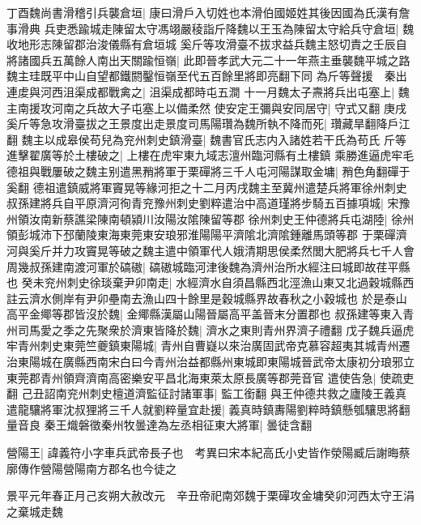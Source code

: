 丁酉魏尚書滑稽引兵襲倉垣|{
	康曰滑戶入切姓也本滑伯國姬姓其後因國為氏漢有詹事滑典}
兵吏悉踰城走陳留太守馮翊嚴稜詣斤降魏以王玉為陳留太守給兵守倉垣|{
	魏收地形志陳留郡治浚儀縣有倉垣城}
奚斤等攻滑臺不拔求益兵魏主怒切責之壬辰自將諸國兵五萬餘人南出天關踰恒嶺|{
	此即晉孝武大元二十一年燕主垂襲魏平城之路魏主珪既平中山自望都鐵閼鑿恒嶺至代五百餘里將即亮翻下同}
為斤等聲援　秦出連䖍與河西沮渠成都戰禽之|{
	沮渠成都時屯五澗}
十一月魏太子燾將兵出屯塞上|{
	魏主南援攻河南之兵故大子屯塞上以備柔然}
使安定王彌與安同居守|{
	守式又翻}
庚戌奚斤等急攻滑臺拔之王景度出走景度司馬陽瓚為魏所執不降而死|{
	瓚藏旱翻降戶江翻}
魏主以成皋侯苟兒為兖州刺史鎮滑臺|{
	魏書官氏志内入諸姓若干氏為苟氏}
斤等進擊翟廣等於土樓破之|{
	上樓在虎牢東九域志澶州臨河縣有土樓鎮}
乘勝進逼虎牢毛德祖與戰屢破之魏主别遣黑矟將軍于栗磾將三千人屯河陽謀取金墉|{
	矟色角翻磾于奚翻}
德祖遣鎮威將軍竇晃等緣河拒之十二月丙戌魏主至冀州遣楚兵將軍徐州刺史叔孫建將兵自平原濟河徇青兖豫州刺史劉粹遣治中高道瑾將步騎五百據項城|{
	宋豫州領汝南新蔡譙梁陳南頓潁川汝陽汝隂陳留等郡}
徐州刺史王仲德將兵屯湖陸|{
	徐州領彭城沛下邳蘭陵東海東莞東安琅邪淮陽陽平濟隂北濟隂鍾離馬頭等郡}
于栗磾濟河與奚斤并力攻竇晃等破之魏主遣中領軍代人娥清期思侯柔然閭大肥將兵七千人會周幾叔孫建南渡河軍於碻磝|{
	碻磝城臨河津後魏為濟州治所水經注曰城即故荏平縣也}
癸未兖州刺史徐琰棄尹卯南走|{
	水經濟水自須昌縣西北涇漁山東又北過穀城縣西註云濟水側岸有尹卯壘南去漁山四十餘里是穀城縣界故春秋之小穀城也}
於是泰山高平金鄊等郡皆沒於魏|{
	金鄊縣漢屬山陽晉屬高平盖晉末分置郡也}
叔孫建等東入青州司馬愛之季之先聚衆於濟東皆降於魏|{
	濟水之東則青州界濟子禮翻}
戊子魏兵逼虎牢青州刺史東莞竺夔鎮東陽城|{
	青州自曹嶷以來治廣固武帝克慕容超夷其城青州遷治東陽城在廣縣西南宋白曰今青州治益都縣州東城即東陽城晉武帝太康初分琅邪立東莞郡青州領齊濟南高密樂安平昌北海東萊太原長廣等郡莞音官}
遣使告急|{
	使疏吏翻}
己丑詔南兖州刺史檀道濟監征討諸軍事|{
	監工銜翻}
與王仲德共救之廬陵王義真遣龍驤將軍沈叔狸將三千人就劉粹量宜赴援|{
	義真時鎮夀陽劉粹時鎮懸瓠驤思將翻量音良}
秦王熾磐徵秦州牧曇達為左丞相征東大將軍|{
	曇徒含翻}


營陽王|{
	諱義符小字車兵武帝長子也　考異曰宋本紀高氏小史皆作滎陽臧后謝晦蔡廓傳作營陽營陽南方郡名也今徒之}


景平元年春正月己亥朔大赦改元　辛丑帝祀南郊魏于栗磾攻金墉癸卯河西太守王涓之棄城走魏

